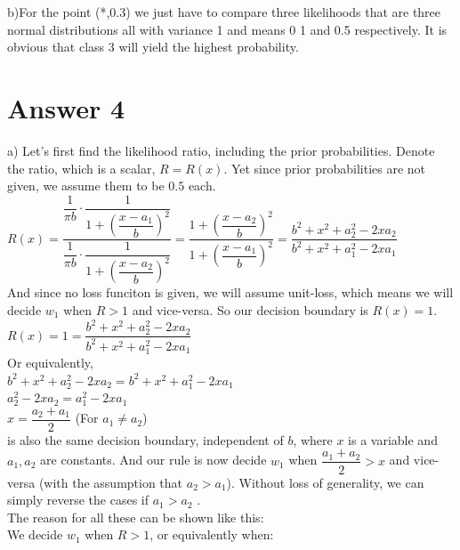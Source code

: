 \documentclass[12pt]{article}
\begin{document}
b)For the point (*,0.3) we just have to compare three likelihoods that are three normal distributions all with variance 1 and  means 0 1 and 0.5 respectively. It is obvious that class 3 will yield the highest probability.\\

\section*{Answer 4}

a) Let's first find the likelihood ratio, including the prior probabilities. Denote the ratio, which is a scalar, $R=R(x)$. Yet since prior probabilities are not given, we assume them to be  $0.5$ each.\\

$R(x)= \dfrac{ \dfrac{1}{\pi b}\cdot \dfrac{1}{1+(\dfrac{x-a_1}{b})^2} }{\dfrac{1}{\pi b}\cdot \dfrac{1}{1+(\dfrac{x-a_2}{b})^2}} = \dfrac{1+(\dfrac{x-a_2}{b})^2}{1+(\dfrac{x-a_1}{b})^2} = \dfrac{b^2+x^2+a_2^2-2xa_2}{b^2+x^2+a_1^2-2xa_1}$ \\

And since no loss funciton is given, we will assume unit-loss, which means we will decide $w_1$ when $R>1$ and vice-versa. So our decision boundary is $R(x)=1$. \\
 
$R(x) = 1 = \dfrac{b^2+x^2+a_2^2-2xa_2}{b^2+x^2+a_1^2-2xa_1}$ \\

Or equivalently,\\

$b^2+x^2+a_2^2-2xa_2 = b^2+x^2+a_1^2-2xa_1$ \\

$ a_2^2-2xa_2 = a_1^2-2xa_1$ \\

$x=\dfrac{a_2+a_1}{2}$ (For $a_1\neq a_2$)\\

is also the same decision boundary, independent of $b$, where $x$ is a variable and $a_1,a_2$ are constants. And our rule is now decide $w_1$ when $\dfrac{a_1+a_2}{2} > x$ and vice-versa (with the assumption that $a_2>a_1$). Without loss of generality, we can simply reverse the cases if $a_1>a_2$ . \\

The reason for all these can be shown like this:\\

We decide $w_1$ when $R>1$, or equivalently when: \\
\end{document}
